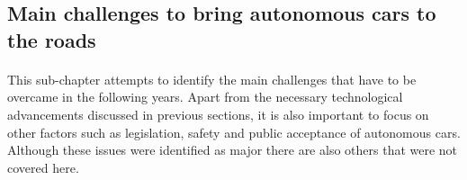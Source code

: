\documentclass[11pt,english]{article}
\begin{document}







\par


\subsection{Main challenges to bring autonomous cars to the roads}
\paragraph{}
This sub-chapter attempts to identify the main challenges that have to be overcame in the following years. Apart from the necessary technological advancements discussed in previous sections, it is also important to focus on other factors such as legislation, safety and public acceptance of autonomous cars. Although these issues were identified as major there are also others that were not covered here.
\end{document}
